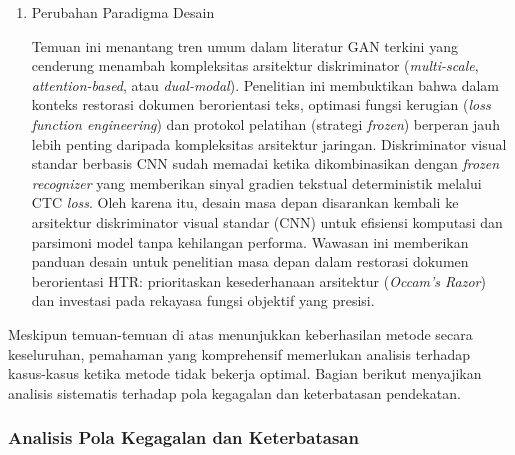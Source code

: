 \begin{enumerate}[leftmargin=1.5em, labelsep=0.5em, itemindent=0pt, label=\arabic*., topsep=0pt, partopsep=0pt]
    \item Perubahan Paradigma Desain
    
    Temuan ini menantang tren umum dalam literatur GAN terkini yang cenderung menambah kompleksitas arsitektur diskriminator (\textit{multi-scale}, \textit{attention-based}, atau \textit{dual-modal}). Penelitian ini membuktikan bahwa dalam konteks restorasi dokumen berorientasi teks, optimasi fungsi kerugian (\textit{loss function engineering}) dan protokol pelatihan (strategi \textit{frozen}) berperan jauh lebih penting daripada kompleksitas arsitektur jaringan. Diskriminator visual standar berbasis CNN sudah memadai ketika dikombinasikan dengan \textit{frozen recognizer} yang memberikan sinyal gradien tekstual deterministik melalui CTC \textit{loss}. Oleh karena itu, desain masa depan disarankan kembali ke arsitektur diskriminator visual standar (CNN) untuk efisiensi komputasi dan parsimoni model tanpa kehilangan performa. Wawasan ini memberikan panduan desain untuk penelitian masa depan dalam restorasi dokumen berorientasi HTR: prioritaskan kesederhanaan arsitektur (\textit{Occam's Razor}) dan investasi pada rekayasa fungsi objektif yang presisi.
\end{enumerate}

Meskipun temuan-temuan di atas menunjukkan keberhasilan metode secara keseluruhan, pemahaman yang komprehensif memerlukan analisis terhadap kasus-kasus ketika metode tidak bekerja optimal. Bagian berikut menyajikan analisis sistematis terhadap pola kegagalan dan keterbatasan pendekatan.

\subsubsection{Analisis Pola Kegagalan dan Keterbatasan}
\label{subsubsec:analisis-kegagalan}

